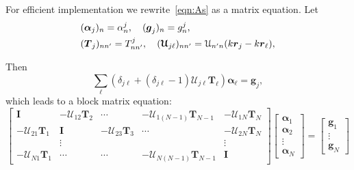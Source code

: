 \documentclass[ 12pt, a4paper]{article}
\renewcommand{\vec}[1]{\boldsymbol{#1}}
\begin{document}
For efficient implementation we rewrite~\eqref{eqn:As} as a matrix equation. Let
\begin{align}
  &(\vec \alpha_j)_n =  \alpha_n^j, \quad (\vec g_j)_n =  g_n^j,
  \\
  &(\vec T_j)_{nn'} = T_{nn'}^j, \quad (\vec {\mathcal U}_{j \ell})_{nn'} = \mathcal U_{n'n}(k \rv_j - k\rv_\ell),
\end{align}

 Then
\begin{equation}
 \sum_{\ell}(\delta_{j \ell} +  (\delta_{j \ell}-1) \vec {\mathcal U}_{j \ell} \vec T_\ell) \vec \alpha_\ell  =  \vec g_j,
\end{equation}
which leads to a block matrix equation:
\begin{equation}
  \begin{bmatrix}
    \vec I & - \vec {\mathcal U}_{1 2}\vec T_2 & \cdots & - \vec {\mathcal U}_{1 (N-1)} \vec T_{N-1} & - \vec {\mathcal U}_{1 N} \vec T_N \\
    - \vec {\mathcal U}_{2 1} \vec T_1 & \vec I &  - \vec {\mathcal U}_{2 3} \vec T_3 & \cdots & - \vec {\mathcal U}_{2 N} \vec T_N \\
     & \vdots & & & \vdots \\
     - \vec {\mathcal U}_{N 1} \vec T_1  & \cdots & \cdots & -  \vec {\mathcal U}_{N (N-1)} \vec T_{N-1} & \vec I
  \end{bmatrix}
  \begin{bmatrix}
    \vec \alpha_1 \\
    \vec \alpha_2 \\
    \vdots \\
    \vec \alpha_N
  \end{bmatrix}
   = \begin{bmatrix}
     \vec g_1 \\
     \vdots \\
     \vec g_N
   \end{bmatrix}
\end{equation}


\printbibliography
\end{document}
